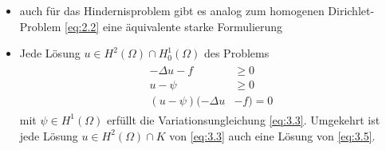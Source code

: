 \begin{itemize}
\item auch für das Hindernisproblem gibt es analog zum homogenen Dirichlet-Problem \eqref{eq:2.2} eine äquivalente starke Formulierung

\item \begin{satz}\label{satz:3.4} Jede Lösung $u \in H^2(\Omega) \cap H^1_0(\Omega)$ des Problems
\begin{align}\label{eq:3.5}
\begin{aligned}
	-\Delta u -f&\ge 0 \\
	u-\psi &\ge 0 \\
	(u-\psi) (-\Delta u &- f) = 0
\end{aligned}
\end{align}
mit $\psi \in H^1(\Omega)$ erfüllt die Variationsungleichung \eqref{eq:3.3}. Umgekehrt ist jede Lösung $u\in H^2(\Omega) \cap K$ von \eqref{eq:3.3} auch eine Lösung von \eqref{eq:3.5}.
\end{satz}


\end{itemize}
